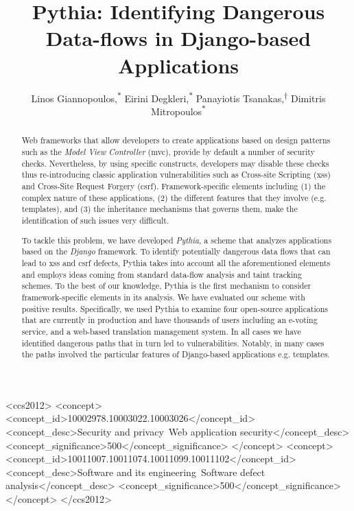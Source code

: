\documentclass[sigconf]{acmart}
\begin{document}
\title{Pythia: Identifying Dangerous Data-flows in Django-based Applications}

\author{Linos Giannopoulos,\textsuperscript{$\ast$}
Eirini Degkleri,\textsuperscript{$\ast$}
Panayiotis Tsanakas,\textsuperscript{$\dagger$}
Dimitris Mitropoulos\textsuperscript{$\ast$}}


\begin{abstract}
Web frameworks that allow developers
to create applications based on design
patterns such as the
{\it Model View Controller} ({\sc mvc}),
provide by default a number of security checks.
Nevertheless,
by using specific constructs,
developers may disable these checks
thus re-introducing classic application
vulnerabilities such as Cross-site Scripting
({\sc xss}) and Cross-Site Request Forgery
({\sc csrf}).
Framework-specific elements including
(1) the complex nature of these applications,
(2) the different features that they involve
(e.g. templates),
and (3) the inheritance mechanisms
that governs them,
make the identification
of such issues very difficult.

To tackle this problem,
we have developed {\it Pythia},
a scheme that analyzes applications
based on the {\it Django} framework.
To identify potentially dangerous
data flows that can lead to
{\sc xss} and {\sc csrf} defects,
Pythia takes into account all the
aforementioned elements and employs
ideas coming from standard
data-flow analysis and taint tracking schemes.
To the best of our knowledge,
Pythia is the first mechanism
to consider framework-specific
elements in its analysis.
We have evaluated our scheme
with positive results.
Specifically,
we used Pythia to examine four open-source
applications that are currently in production
and have thousands of users
including an e-voting service,
and a web-based translation
management system.
In all cases we have identified dangerous paths
that in turn led to vulnerabilities.
Notably,
in many cases the paths involved the
particular features of Django-based
applications e.g. templates.
\end{abstract}

\begin{CCSXML}
<ccs2012>
<concept>
<concept_id>10002978.10003022.10003026</concept_id>
<concept_desc>Security and privacy~Web application security</concept_desc>
<concept_significance>500</concept_significance>
</concept>
<concept>
<concept_id>10011007.10011074.10011099.10011102</concept_id>
<concept_desc>Software and its engineering~Software defect analysis</concept_desc>
<concept_significance>500</concept_significance>
</concept>
</ccs2012>
\end{CCSXML}
\end{document}
